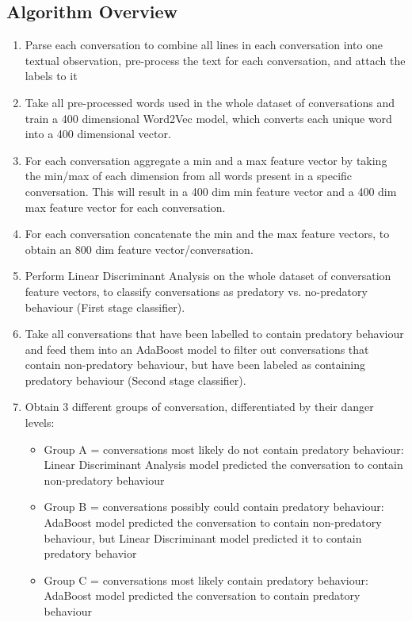\documentclass[11pt]{article}
\begin{document}
\subsection{Algorithm Overview}
\begin{enumerate}
    \item Parse each conversation to combine all lines in each conversation into one textual observation, pre-process the text for each conversation, and attach the labels to it 
    \item Take all pre-processed words used in the whole dataset of conversations and train a 400 dimensional Word2Vec model, which converts each unique word into a 400 dimensional vector.
    \item For each conversation aggregate a min and a max feature vector by taking the min/max of each dimension from all words present in a specific conversation. This will result in a 400 dim min feature vector and a 400 dim max feature vector for each conversation.
    \item For each conversation concatenate the min and the max feature vectors, to obtain an 800 dim feature vector/conversation.
    \item Perform Linear Discriminant Analysis on the whole dataset of conversation feature vectors, to classify conversations as predatory vs. no-predatory behaviour (First stage classifier).
    \item Take all conversations that have been labelled to contain predatory behaviour and feed them into an AdaBoost model to filter out conversations that contain non-predatory behaviour, but have been labeled as containing predatory behaviour (Second stage classifier).
    \item Obtain 3 different groups of conversation, differentiated by their danger levels:
    \begin{itemize}
        \item Group A = conversations most likely do not contain predatory behaviour: Linear Discriminant Analysis model predicted the conversation to contain non-predatory behaviour 
        \item Group B = conversations possibly could contain predatory behaviour: AdaBoost model predicted the conversation to contain non-predatory behaviour, but Linear Discriminant model predicted it to contain predatory behavior
        \item Group C = conversations most likely contain predatory behaviour: AdaBoost model predicted the conversation to contain predatory behaviour
    \end{itemize}
\end{enumerate}
\end{document}

